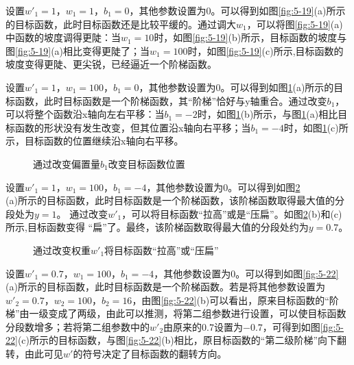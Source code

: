 \parinterval 设置$ w'_1=1 $，$ w_1=1 $，$ b_1=0 $，其他参数设置为0。可以得到如图\ref{fig:5-19}(a)所示的目标函数，此时目标函数还是比较平缓的。通过调大$ w_1 $，可以将图\ref{fig:5-19}(a) 中函数的坡度调得更陡：当$ w_1=10 $时，如图\ref{fig:5-19}(b)所示，目标函数的坡度与图\ref{fig:5-19}(a)相比变得更陡了；当$ w_1=100 $时，如图\ref{fig:5-19}(c)所示,目标函数的坡度变得更陡、更尖锐，已经逼近一个阶梯函数。

\parinterval 设置$ w'_1=1 $，$ w_1=100 $，$ b_1=0 $，其他参数设置为0。可以得到如图\ref{fig:5-20}(a)所示的目标函数，此时目标函数是一个阶梯函数，其``阶梯''恰好与y轴重合。通过改变$ b_1 $，可以将整个函数沿x轴向左右平移：当$ b_1=-2 $时，如图\ref{fig:5-20}(b)所示，与图\ref{fig:5-20}(a)相比目标函数的形状没有发生改变，但其位置沿x轴向右平移；当$ b_1=-4 $时，如图\ref{fig:5-20}(c)所示，目标函数的位置继续沿x轴向右平移。

\begin{figure}[htp]
\centering

\caption{通过改变偏置量$ b_1 $改变目标函数位置}
\label{fig:5-20}
\end {figure}

\parinterval 设置$ w'_1=1 $，$ w_1=100 $，$ b_1=-4 $，其他参数设置为0。可以得到如图\ref{fig:5-21}\\(a)所示的目标函数，此时目标函数是一个阶梯函数，该阶梯函数取得最大值的分段处为$ y=1 $。 通过改变$ w'_1 $，可以将目标函数``拉高''或是``压扁''。如图\ref{fig:5-21}(b)和(c)所示,目标函数变得 ``扁''了。最终，该阶梯函数取得最大值的分段处约为$ y=0.7 $。

\begin{figure}[htp]
\centering

\caption{通过改变权重$ w'_1 $将目标函数``拉高''或``压扁''}
\label{fig:5-21}
\end {figure}

\parinterval 设置$ w'_1=0.7 $，$ w_1=100 $，$ b_1=-4 $，其他参数设置为0。可以得到如图\ref{fig:5-22}\\(a)所示的目标函数，此时目标函数是一个阶梯函数。若是将其他参数设置为$ w'_2=0.7 $，$ w_2=100 $，$ b_2=16 $，由图\ref{fig:5-22}(b)可以看出，原来目标函数的``阶梯''由一级变成了两级，由此可以推测，将第二组参数进行设置，可以使目标函数分段数增多；若将第二组参数中的$ w'_2 $由原来的$ 0.7 $设置为$ -0.7 $，可得到如图\ref{fig:5-22}(c)所示的目标函数，与图\ref{fig:5-22}(b)相比，原目标函数的``第二级阶梯''向下翻转，由此可见$ w' $的符号决定了目标函数的翻转方向。

